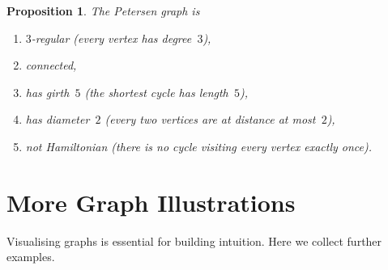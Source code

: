 \documentclass[12pt,a4paper,openany]{book}
\theoremstyle{definition}
\theoremstyle{plain}
\newtheorem{proposition}[definition]{Proposition}
\theoremstyle{remark}
\begin{document}
\begin{center}
\label{fig:petersen}
\end{center}

\begin{proposition}\label{prop:petersen-properties}
The Petersen graph is
\begin{enumerate}
\item $3$-regular (every vertex has degree~$3$),
\item connected,
\item has girth~$5$ (the shortest cycle has length~$5$),
\item has diameter~$2$ (every two vertices are at distance at most~$2$),
\item not Hamiltonian (there is no cycle visiting
      every vertex exactly once).
\end{enumerate}
\end{proposition}

\section{More Graph Illustrations}\label{sec:graph-illustrations}

Visualising graphs is essential for building intuition.  Here we collect
further examples.
\end{document}
